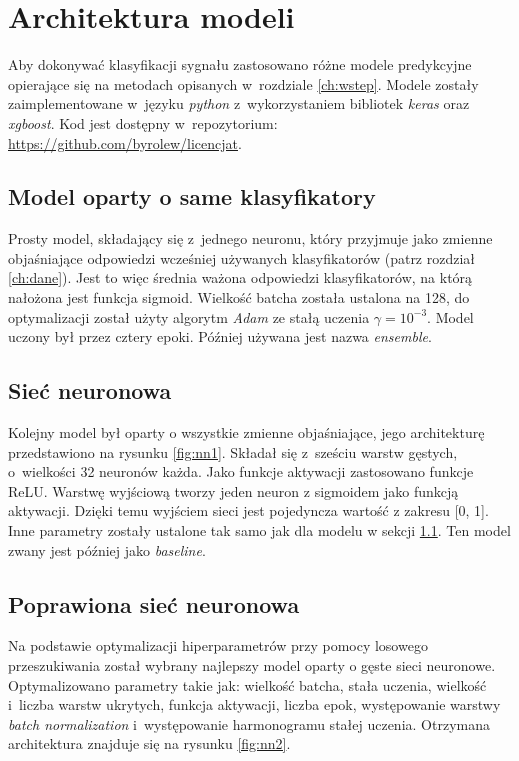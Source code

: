 \documentclass{pracalicmgr}
\begin{document}
		
    \chapter{Architektura modeli}
	Aby dokonywać klasyfikacji sygnału zastosowano różne modele predykcyjne opierające się na metodach opisanych w~rozdziale \ref{ch:wstep}. Modele zostały zaimplementowane w~języku \textit{python} z~wykorzystaniem bibliotek \textit{keras} oraz \textit{xgboost}. Kod jest dostępny w~repozytorium: \url{https://github.com/byrolew/licencjat}.
	\section{Model oparty o same klasyfikatory}
	\label{sec:mod1}
	Prosty model, składający się z~jednego neuronu, który przyjmuje jako zmienne objaśniające odpowiedzi wcześniej używanych klasyfikatorów (patrz rozdział \ref{ch:dane}). Jest to więc średnia ważona odpowiedzi klasyfikatorów, na którą nałożona jest funkcja sigmoid. Wielkość batcha została ustalona na 128, do optymalizacji został użyty algorytm \textit{Adam} ze stałą uczenia $\gamma = 10^{-3}$. Model uczony był przez cztery epoki. Później używana jest nazwa \textit{ensemble}.

	\section{Sieć neuronowa}
	\label{sec:mod2}
	Kolejny model był oparty o wszystkie zmienne objaśniające, jego architekturę przedstawiono na rysunku \ref{fig:nn1}. Składał się z~sześciu warstw gęstych, o~wielkości 32 neuronów każda. Jako funkcje aktywacji zastosowano funkcje ReLU. Warstwę wyjściową tworzy jeden neuron z sigmoidem jako funkcją aktywacji. Dzięki temu wyjściem sieci jest pojedyncza wartość z zakresu [0, 1]. Inne parametry zostały ustalone tak samo jak dla modelu w sekcji \ref{sec:mod1}. Ten model zwany jest później jako \textit{baseline}.
	
	\section{Poprawiona sieć neuronowa}
	Na podstawie optymalizacji hiperparametrów przy pomocy losowego przeszukiwania został wybrany najlepszy model oparty o gęste sieci neuronowe. Optymalizowano parametry takie jak: wielkość batcha, stała uczenia, wielkość i~liczba warstw ukrytych, funkcja aktywacji, liczba epok, występowanie warstwy \textit{batch normalization} i~występowanie harmonogramu stałej uczenia. Otrzymana architektura znajduje się na rysunku \ref{fig:nn2}. 
	
\end{document}
